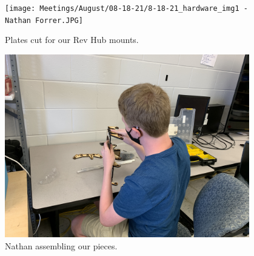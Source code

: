 \begin{figure}[ht]
\centering
\begin{minipage}[b]{.48\textwidth}
  \centering
  \texttt{[image: Meetings/August/08-18-21/8-18-21\_hardware\_img1 - Nathan Forrer.JPG]}
  \caption{Plates cut for our Rev Hub mounts.}
  \label{fig:081821_1}
\end{minipage}%
\hfill%
\begin{minipage}[b]{.48\textwidth}
  \centering
  \includegraphics[width=0.95\textwidth]{Meetings/August/08-18-21/8-18-21_hardware_img2 - Nathan Forrer.JPG}
  \caption{Nathan assembling our pieces.}
  \label{fig:081821_2}
\end{minipage}
\end{figure}


